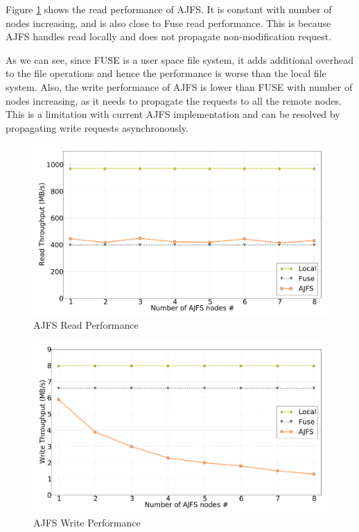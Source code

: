 Figure \ref{fig:readperf} shows the read performance of AJFS. It is constant with number of nodes increasing, and is also close to Fuse read performance.
This is because AJFS handles read locally and does not propagate non-modification request.

As we can see, since FUSE is a user space file system, it adds additional
 overhead to the file operations and hence the performance is worse than the local file system.
Also, the write performance of AJFS is lower than FUSE with number of nodes increasing, as it needs to propagate the requests to all the remote nodes.
 This is a limitation with current AJFS implementation and can be resolved by propagating write requests asynchronously.

\begin{figure}[Ht]
\includegraphics[width=\linewidth]{readperf.pdf}
\caption{AJFS Read Performance}
\label{fig:readperf}
\vspace{-5mm}
\end{figure}

\begin{figure}[Ht]
\includegraphics[width=\linewidth]{writeperf.pdf}
\caption{AJFS Write Performance}
\label{fig:writeperf}
\vspace{-5mm}
\end{figure}

